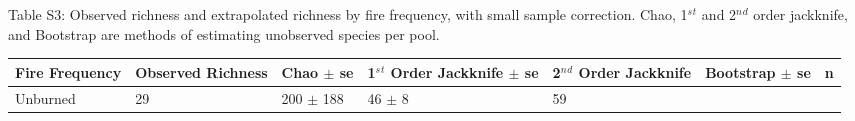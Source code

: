 \documentclass[8pt,]{article}
\begin{document}
\clearpage
\newpage

Table S3: Observed richness and extrapolated richness by fire frequency,
with small sample correction. Chao, 1\(^s\)\(^t\) and 2\(^n\)\(^d\)
order jackknife, and Bootstrap are methods of estimating unobserved
species per pool.

\begin{longtable}[]{@{}lllllll@{}}
\toprule
\begin{minipage}[b]{0.11\columnwidth}\raggedright\strut
Fire Frequency\strut
\end{minipage} & \begin{minipage}[b]{0.11\columnwidth}\raggedright\strut
Observed Richness\strut
\end{minipage} & \begin{minipage}[b]{0.12\columnwidth}\raggedright\strut
Chao \(\pm\) se\strut
\end{minipage} & \begin{minipage}[b]{0.10\columnwidth}\raggedright\strut
1\(^s\)\(^t\) Order Jackknife \(\pm\) se\strut
\end{minipage} & \begin{minipage}[b]{0.10\columnwidth}\raggedright\strut
2\(^n\)\(^d\) Order Jackknife\strut
\end{minipage} & \begin{minipage}[b]{0.18\columnwidth}\raggedright\strut
Bootstrap \(\pm\) se\strut
\end{minipage} & \begin{minipage}[b]{0.04\columnwidth}\raggedright\strut
n\strut
\end{minipage}\tabularnewline
\midrule
\endhead
\begin{minipage}[t]{0.11\columnwidth}\raggedright\strut
Unburned\strut
\end{minipage} & \begin{minipage}[t]{0.11\columnwidth}\raggedright\strut
29\strut
\end{minipage} & \begin{minipage}[t]{0.12\columnwidth}\raggedright\strut
200 \(\pm\) 188\strut
\end{minipage} & \begin{minipage}[t]{0.10\columnwidth}\raggedright\strut
46 \(\pm\) 8\strut
\end{minipage} & \begin{minipage}[t]{0.10\columnwidth}\raggedright\strut
59\strut
\end{minipage} & \begin{minipage}[t]{0.18\columnwidth}\raggedright\strut

\end{minipage}
\end{longtable}
\end{document}
